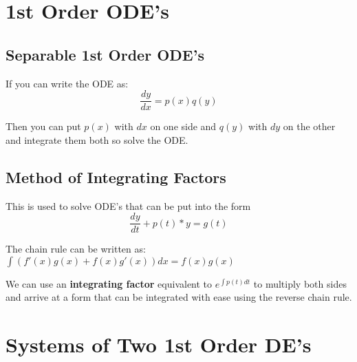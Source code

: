 \documentclass[a4paper,12pt]{report}
\begin{document}
\chapter{1st Order ODE's}
\section{Separable 1st Order ODE's}
If you can write the ODE as: $$\frac{dy}{dx} = p(x)q(y)$$

Then you can put $p(x)$ with $dx$ on one side and $q(y)$ with  $dy$ on the other and 
integrate them both so solve the ODE.

\section{Method of Integrating Factors}
This is used to solve ODE's that can be put into the form 
$$\frac{dy}{dt} + p(t)*y = g(t)$$

The chain rule can be written as: $\int (f'(x)g(x) + f(x)g'(x)) dx =  f(x)g(x)$

We can use an \textbf{integrating factor} equivalent to $e^{\int p(t) dt}$ to multiply
both sides and arrive at a form that can be integrated with ease using the reverse chain 
rule.

\chapter{Systems of Two 1st Order DE's}
\end{document}
